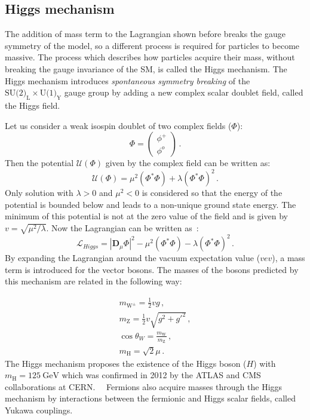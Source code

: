 \subsection{Higgs mechanism}%
\label{sec:theory:standardmodel:higgs}
The addition of mass term to the Lagrangian shown before breaks the gauge symmetry of the model, so a different process is required for particles to become massive. The process which describes how particles acquire their mass, without breaking the gauge invariance of the SM, is called the Higgs mechanism. The Higgs mechanism introduces \textit{spontaneous symmetry breaking} of the $\text{SU(2)}_{\text{L}} \times \text{U(1)}_{\text{Y}}$ gauge group by adding a new complex scalar doublet field, called the Higgs field.~\cite{halzen} 

Let us consider a weak isospin doublet of two complex fields ($\Phi$):
\begin{equation}
\Phi = \begin{pmatrix} \phi^{+} \\ \phi^{o} \end{pmatrix} \,.
\end{equation}
Then the potential $\mathcal{U}(\Phi)$ given by the complex field can be written as:
\begin{equation}
\mathcal{U}(\Phi) = \mu^{2}(\Phi^{*}\Phi) + \lambda(\Phi^{*}\Phi)^{2} \,.
\end{equation}
Only solution with $\lambda>0$ and $\mu^{2}<0$ is considered so that the energy of the potential is bounded below and leads to a non-unique ground state energy. The minimum of this potential is not at the zero value of the field and is given by $v = \sqrt{\mu^{2}/\lambda}$. Now the Lagrangian can be written as~\cite{halzen}:
\begin{equation}
\mathcal{L}_{Higgs} = |\textbf{D}_{\mu}\Phi|^{2} - \mu^{2}(\Phi^{*}\Phi) - \lambda(\Phi^{*}\Phi)^{2} \,.
\end{equation}
By expanding the Lagrangian around the vacuum expectation value ($vev$), a mass term is introduced for the vector bosons. The masses of the bosons predicted by this mechanism are related in the following way:

\begin{align}
m_{\text{W}^{\pm}} = \frac{1}{2}vg \,, \\
m_{\text{Z}} = \frac{1}{2}v\sqrt{g^{2} + g'^{2}} \,, \\
\cos\theta_{W} = \frac{m_{\text{W}}}{m_{\text{Z}}} \,, \\
m_{\text{H}} = \sqrt{2}\mu \,.
\end{align}
The Higgs mechanism
proposes the existence of the Higgs boson ($H$) with $m_{\text{H}}=\SI{125}{\giga\electronvolt}$ which was confirmed in 2012 by the ATLAS and CMS collaborations at CERN.~\cite{higgsatlas}~\cite{higgscms} Fermions also acquire masses through the Higgs mechanism by interactions between the fermionic and Higgs scalar fields, called Yukawa couplings.~\cite{halzen}

